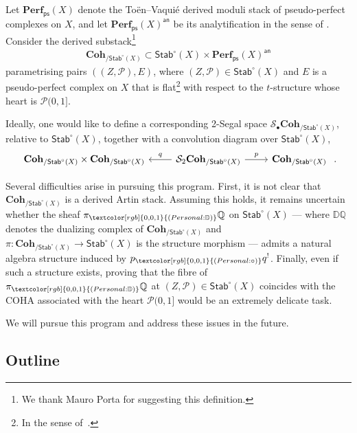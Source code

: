 \documentclass[reqno,a4paper]{amsart}
\newcommand{\personal}[1]{\textcolor[rgb]{0,0,1}{(Personal: #1)}}
\newcommand{\parth}[1]{\textcolor[rgb]{0,1,0}{(Parth: #1)}}
\newcommand{\todo}[1]{\textcolor{red}{(Todo: #1)}}
\newcommand\ast{\personal}[1]{\ignorespaces}
\newcommand\ast{\parth}[1]{\ignorespaces}
\newcommand\ast{\todo}[1]{\ignorespaces}
\newcommand{\calP}{\mathcal{P}}
\newcommand{\calS}{\mathcal{S}}
\newcommand{\D}{\mathbb{D}}
\newcommand{\Q}{\mathbb{Q}}
\newcommand{\Stab}{\mathsf{Stab}}
\newcommand{\dstackPerfps}{\mathbf{Perf}_{\mathsf{ps}}}
\newcommand{\dstackCoh}{\mathbf{Coh}}
\newcommand{\rsv}{X}
\theoremstyle{basic-theorem}
\numberwithin{equation}{section}
\begin{document}
Let $ \dstackPerfps(\rsv)$ denote the Toën--Vaquié derived moduli stack of pseudo-perfect complexes on $\rsv$, and let $ \dstackPerfps(\rsv)^{\mathsf{an}}$ be its analytification in the sense of \cite{Porta_Yu_Higher_Analytic_Stacks}. Consider the derived substack\footnote{We thank Mauro Porta for suggesting this definition.}
\begin{align}
	\dstackCoh_{/\Stab^\circ(\rsv)}\subset \Stab^\circ(\rsv)\times \dstackPerfps(\rsv)^{\mathsf{an}}
\end{align}
parametrising pairs $((Z,\calP),E)$, where $(Z,\calP)\in \Stab^\circ(\rsv)$ and $E$ is a pseudo-perfect complex on $\rsv$ that is flat\footnote{In the sense of~\cite[Definition~\ref*{torsion-pairs-def:flatness_wrt_t_structure}]{DPS_Torsion-pairs}.} with respect to the $t$-structure whose heart is $\calP(0,1]$.

Ideally, one would like to define a corresponding 2-Segal space $\calS_\bullet \dstackCoh_{/\Stab^\circ(\rsv)}$, relative to $\Stab^\circ(\rsv)$, together with a convolution diagram over $\Stab^\circ(\rsv)$,
\begin{align}
	\begin{tikzcd}[ampersand replacement=\&]
		\dstackCoh_{/\Stab^\circ(\rsv)} \times \dstackCoh_{/\Stab^\circ(\rsv)} \& \calS_2\dstackCoh_{/\Stab^\circ(\rsv)} \ar{r}{p} \ar{l}[swap]{q}\& \dstackCoh_{/\Stab^\circ(\rsv)}
	\end{tikzcd}\ .
\end{align}

Several difficulties arise in pursuing this program. First, it is not clear that $\dstackCoh_{/\Stab^\circ(\rsv)}$ is a derived Artin stack. Assuming this holds, it remains uncertain whether the sheaf $\pi_\ast \D\Q$ on
$\Stab^\circ(\rsv)$ --- where $\D\Q$ denotes the dualizing complex of
$\dstackCoh_{/\Stab^\circ(\rsv)}$ and $\pi\colon
\dstackCoh_{/\Stab^\circ(\rsv)}\to \Stab^\circ(\rsv)$ is the structure morphism
--- admits a natural algebra structure induced by $p_\ast \circ q^!$. Finally, even if such a structure exists, proving that the fibre of $\pi_\ast \D\Q$ at $(Z,\calP)\in \Stab^\circ(\rsv)$ coincides with the COHA associated with the heart $\calP(0,1]$ would be an extremely delicate task.

We will pursue this program and address these issues in the future.

\subsection*{Outline}
\end{document}
